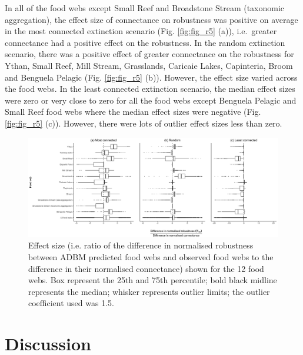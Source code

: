 \documentclass{article}
\begin{document}
In all of the food webs except Small Reef and Broadstone Stream
(taxonomic aggregation), the effect size of connectance on robustness
was positive on average in the most connected extinction scenario (Fig.
\ref{fig:fig_r5} (a)), i.e.~greater connectance had a positive effect on
the robustness. In the random extinction scenario, there was a positive
effect of greater connectance on the robustness for Ythan, Small Reef,
Mill Stream, Grasslands, Caricaie Lakes, Capinteria, Broom and Benguela
Pelagic (Fig. \ref{fig:fig_r5} (b)). However, the effect size varied
across the food webs. In the least connected extinction scenario, the
median effect sizes were zero or very close to zero for all the food
webs except Benguela Pelagic and Small Reef food webs where the median
effect sizes were negative (Fig. \ref{fig:fig_r5} (c)). However, there
were lots of outlier effect sizes less than zero.

\begin{figure}

{\centering \includegraphics[width=450px]{../results/plot_R50_slope} 

}

\caption{\label{fig:fig_r5} Effect size (i.e. ratio of the difference in normalised robustness between ADBM predicted food webs and observed food webs to the difference in their normalised connectance) shown for the 12 food webs. Box represent the 25th and 75th percentile; bold black midline represents the median; whisker represents outlier limits; the outlier coefficient used was 1.5.}\label{fig:unnamed-chunk-6}
\end{figure}

\hypertarget{discussion}{%
\section{Discussion}\label{discussion}}
\end{document}
